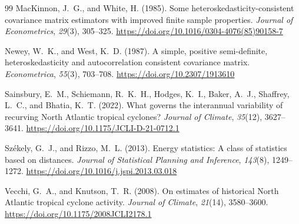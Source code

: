 \documentclass[11pt]{article}
\begin{document}
\begin{thebibliography}{99}
MacKinnon, J.~G., and White, H. (1985).
Some heteroskedasticity-consistent covariance matrix estimators with improved finite sample properties.
\textit{Journal of Econometrics}, \textit{29}(3), 305--325.
\url{https://doi.org/10.1016/0304-4076(85)90158-7}

Newey, W.~K., and West, K.~D. (1987).
A simple, positive semi-definite, heteroskedasticity and autocorrelation consistent covariance matrix.
\textit{Econometrica}, \textit{55}(3), 703--708.
\url{https://doi.org/10.2307/1913610}

Sainsbury, E.~M., Schiemann, R.~K.~H., Hodges, K.~I., Baker, A.~J., Shaffrey, L.~C., and Bhatia, K.~T. (2022).
What governs the interannual variability of recurving North Atlantic tropical cyclones?
\textit{Journal of Climate}, \textit{35}(12), 3627--3641.
\url{https://doi.org/10.1175/JCLI-D-21-0712.1}

Sz\'ekely, G.~J., and Rizzo, M.~L. (2013).
Energy statistics: A class of statistics based on distances.
\textit{Journal of Statistical Planning and Inference}, \textit{143}(8), 1249--1272.
\url{https://doi.org/10.1016/j.jspi.2013.03.018}

Vecchi, G.~A., and Knutson, T.~R. (2008).
On estimates of historical North Atlantic tropical cyclone activity.
\textit{Journal of Climate}, \textit{21}(14), 3580--3600.
\url{https://doi.org/10.1175/2008JCLI2178.1}

\end{thebibliography}
\end{document}
